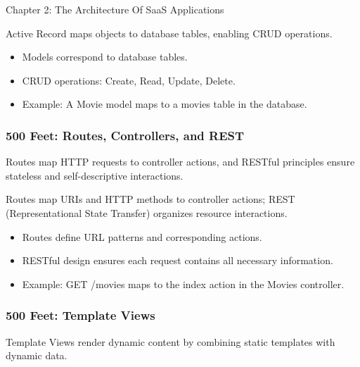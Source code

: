\begin{notes}{Chapter 2: The Architecture Of SaaS Applications}
\begin{highlight}
        Active Record maps objects to database tables, enabling CRUD operations.
        
        \begin{itemize}
            \item Models correspond to database tables.
            \item CRUD operations: Create, Read, Update, Delete.
            \item Example: A Movie model maps to a movies table in the database.
        \end{itemize}
    
    \end{highlight}
    
    \subsubsection*{500 Feet: Routes, Controllers, and REST}
    
    Routes map HTTP requests to controller actions, and RESTful principles ensure stateless and self-descriptive interactions.
    
    \begin{highlight}
    
        Routes map URIs and HTTP methods to controller actions; REST (Representational State Transfer) organizes resource interactions.
        
        \begin{itemize}
            \item Routes define URL patterns and corresponding actions.
            \item RESTful design ensures each request contains all necessary information.
            \item Example: GET /movies maps to the index action in the Movies controller.
        \end{itemize}
    
    \end{highlight}
    
    \subsubsection*{500 Feet: Template Views}
    
    Template Views render dynamic content by combining static templates with dynamic data.
    
    \begin{highlight}
    

\end{highlight}
\end{notes}
